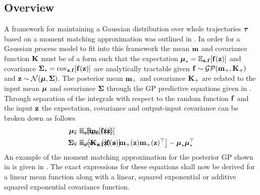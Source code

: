\subsection{Overview}
A framework for maintaining a Gaussian distribution over whole trajectories $\boldsymbol{\tau}$ based on a moment matching approximation was outlined in . In order for a Gaussian process model to fit into this framework the mean $\mathbf{m}$ and covariance function $\mathbf{K}$ must be of a form such that the expectation $\boldsymbol{\mu}_* = \mathbb{E}_{\mathbf{z},\mathbf{f}}[\mathbf{f}(\mathbf{z})]$ and covariance $\boldsymbol{\Sigma}_* = \mathrm{cov}_{\mathbf{z},\mathbf{f}}[\mathbf{f}(\mathbf{z})]$ are analytically tractable given $\mathbf{f}\sim\mathcal{GP}(\mathbf{m}_+,\mathbf{K}_+)$ and $\mathbf{z} \sim \mathcal{N}(\boldsymbol{\mu},\boldsymbol{\Sigma})$. The posterior mean $\mathbf{m}_+$ and covariance $\mathbf{K}_+$ are related to the input mean $\boldsymbol{\mu}$ and covariance $\boldsymbol{\Sigma}$ through the GP predictive equations given in . Through separation of the integrals with respect to the random function $\mathbf{f}$ and the input $\mathbf{z}$ the expectation, covariance and output-input covariance can be broken down as follows
\begin{align}
\bm_* &=  \EE_{\bz,\bff}[\bff(\bz)]
&& \!\!\!\!\!\!\!\!\!\!\!\!\!\!\!\!\!\!\!\!\!\!\!\!\!\!\!\!\!\!\!\!\!\!\!\!\!\!\!\!\!\!\!\!\!\!\!\!\!
= \EE_{\bz}[\bmm_+(\bz)] \label{eqn:uncM} \\
\bS_* &= \cov_{\bz,\bff}[\bff(\bz)] 
&& \!\!\!\!\!\!\!\!\!\!\!\!\!\!\!\!\!\!\!\!\!\!\!\!\!\!\!\!\!\!\!\!\!\!\!\!\!\!\!\!\!\!\!\!\!\!\!\!\!
= \EE_{\bz}\big[\bK_+(\bz) + \bmm_+(\bz)\bmm_+(\bz)\T\big] - \bm_*\bm_*\T \label{eqn:uncV} 
\end{align}
An example of the moment matching approximation for the posterior GP shown in  is given in . The exact expressions for these equations shall now be derived for a linear mean function along with a linear, squared exponential or additive squared exponential covariance function.







